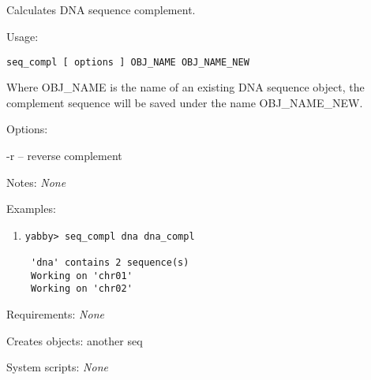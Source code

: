 


\subsection[seq\_compl]{  }



Calculates DNA sequence complement.


\begin{description}


\item{Usage:}

{\tt seq\_compl [ options ] OBJ\_NAME OBJ\_NAME\_NEW}

Where OBJ\_NAME is the name of an existing DNA sequence object,
the complement sequence will be saved under the name OBJ\_NAME\_NEW.



\item{Options:}
\begin{description}
\item -r -- reverse complement
\end{description}


\item{Notes:} {\em None}


\item{Examples:}
\begin{enumerate}

\item
\begin{verbatim}
yabby> seq_compl dna dna_compl

 'dna' contains 2 sequence(s)
 Working on 'chr01'
 Working on 'chr02'

\end{verbatim}

\end{enumerate}


\item{Requirements:} {\em None}


\item{Creates objects:} another seq


\item{System scripts:} {\em None}

\end{description}

